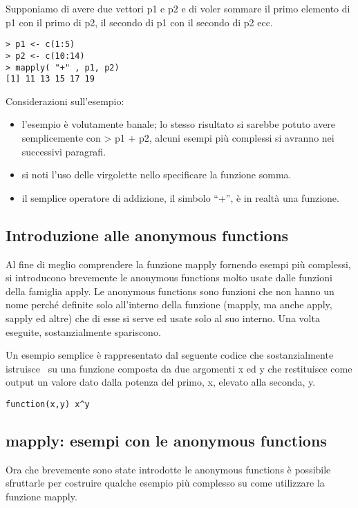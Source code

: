 Supponiamo di avere due vettori p1 e p2 e di voler sommare il primo elemento di p1 con il primo di p2, il secondo di p1 con il secondo di p2 ecc.

\begin{lstlisting}
> p1 <- c(1:5)
> p2 <- c(10:14)
> mapply( "+" , p1, p2)
[1] 11 13 15 17 19
\end{lstlisting}

Considerazioni sull'esempio:
\begin{itemize}
\item l'esempio è volutamente banale; lo stesso risultato si sarebbe potuto avere semplicemente con \textsf{> p1 + p2}, alcuni esempi più complessi si avranno nei successivi paragrafi. 
\item si noti l'uso delle virgolette nello specificare la funzione somma.
\item il semplice operatore di addizione, il simbolo ``+'', è in realtà una funzione.
\end{itemize}

\subsection{Introduzione alle anonymous functions}

Al fine di meglio comprendere la funzione \textsf{mapply} fornendo esempi più complessi, si introducono brevemente le anonymous functions molto usate dalle funzioni della famiglia \textsf{apply}. Le anonymous functions sono funzioni che non hanno un nome perché definite solo all'interno della funzione (\textsf{mapply}, ma anche \textsf{apply}, \textsf{sapply} ed altre) che di esse si serve ed usate solo al suo interno. Una volta eseguite, sostanzialmente spariscono.

Un esempio semplice è rappresentato dal seguente codice che sostanzialmente istruisce \erre\ su una funzione composta da due argomenti x ed y che restituisce come output un valore dato dalla potenza del primo, x, elevato alla seconda, y.

\begin{lstlisting}
function(x,y) x^y
\end{lstlisting}


\subsection{mapply: esempi con le anonymous functions}

Ora che brevemente sono state introdotte le anonymous functions è possibile sfruttarle per costruire qualche esempio più complesso su come utilizzare la funzione \textsf{mapply}.

